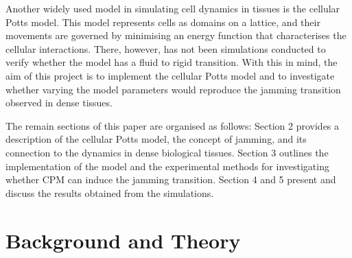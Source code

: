 \documentclass[a4paper,12pt]{article}
\begin{document}
Another widely used model in simulating cell dynamics in tissues is the cellular Potts model. This model represents cells as domains on a lattice, and their movements are governed by minimising an energy function that characterises the cellular interactions. There, however, has not been simulations conducted to verify whether the model has a fluid to rigid transition. With this in mind, the aim of this project is to implement the cellular Potts model and to investigate whether varying the model parameters would reproduce the jamming transition observed in dense tissues. 

The remain sections of this paper are organised as follows: Section 2 provides a description of the cellular Potts model, the concept of jamming, and its connection to the dynamics in dense biological tissues. Section 3 outlines the implementation of the model and the experimental methods for investigating whether CPM can induce the jamming transition. Section 4 and 5 present and discuss the results obtained from the simulations. 


%


\section{Background and Theory}

%
%
\end{document}
